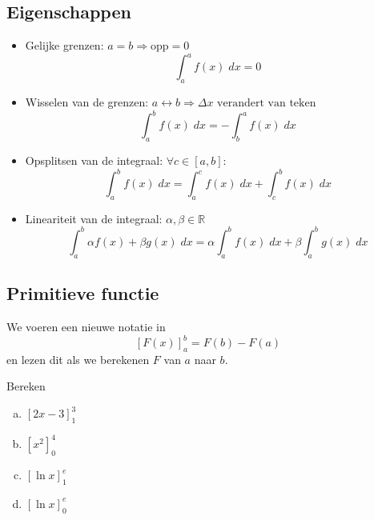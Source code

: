 \documentclass[a4paper,12pt, twoside]{article}
\begin{document}
\subsection{Eigenschappen}

\begin{itemize}
  \item Gelijke grenzen: $a=b \Rightarrow \mbox{opp}=0$
  $$\int_a^a f(x)\;dx = 0$$
  \item Wisselen van de grenzen: $a\leftrightarrow b \Rightarrow \Delta x \mbox{ verandert van teken}$
  $$\int_a^b f(x)\;dx = -\int_b^a f(x)\;dx$$
  \item Opsplitsen van de integraal: $\forall c\in[a,b]:$
  $$\int_a^b f(x)\;dx = \int_a^c f(x)\;dx + \int_c^b f(x)\;dx$$
  \item Lineariteit van de integraal: $\alpha, \beta\in\mathbb{R}$
  $$\int_a^b \alpha f(x) + \beta g(x)\;dx = \alpha \int_a^b f(x) \;dx+ \beta \int_a^b g(x)\;dx$$
\end{itemize}

\subsection{Primitieve functie}

We voeren een nieuwe notatie in
$$[F(x)]_a^b = F(b) - F(a)$$
en lezen dit als we berekenen $F$ van $a$ naar $b$.

\begin{oefening}
Bereken
\begin{multicols}{2}
\begin{enumerate}[(a)]
  \itemsep.5em
  \item $\displaystyle\left[2x-3\right]_1^3$
  \item $\displaystyle\left[x^2\right]_0^4$
  \item $\displaystyle\left[\ln x\right]_1^e$
  \item $\displaystyle\left[\ln x\right]_0^e$
\end{enumerate}
\end{multicols}
\end{oefening}
\end{document}
